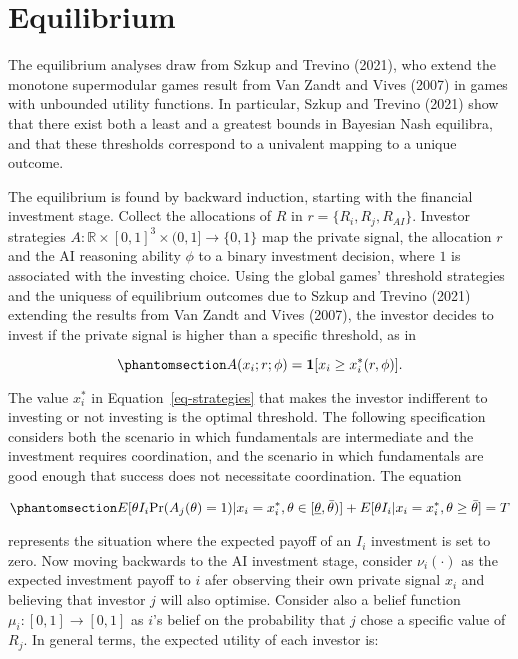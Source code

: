 \documentclass[
]{article}
\theoremstyle{plain}
\theoremstyle{definition}
\theoremstyle{remark}
\begin{document}
\section{Equilibrium}\label{equilibrium}

The equilibrium analyses draw from Szkup and Trevino (2021), who extend
the monotone supermodular games result from Van Zandt and Vives (2007)
in games with unbounded utility functions. In particular, Szkup and
Trevino (2021) show that there exist both a least and a greatest bounds
in Bayesian Nash equilibra, and that these thresholds correspond to a
univalent mapping to a unique outcome.

The equilibrium is found by backward induction, starting with the
financial investment stage. Collect the allocations of \(R\) in
\(r=\{R_i, R_j, R_{AI}\}\). Investor strategies
\(A : \mathbb{R} \times [0,1]^3 \times (0,1]\to \{0,1\}\) map the
private signal, the allocation \(r\) and the AI reasoning ability
\(\phi\) to a binary investment decision, where \(1\) is associated with
the investing choice. Using the global games' threshold strategies and
the uniquess of equilibrium outcomes due to Szkup and Trevino (2021)
extending the results from Van Zandt and Vives (2007), the investor
decides to invest if the private signal is higher than a specific
threshold, as in

\begin{equation}\phantomsection\label{eq-strategies}{
A(x_i;r;\phi) = \mathbf{1}[x_i \geq x_i^*(r, \phi)].
}\end{equation}

The value \(x_i^*\) in Equation~\ref{eq-strategies} that makes the
investor indifferent to investing or not investing is the optimal
threshold. The following specification considers both the scenario in
which fundamentals are intermediate and the investment requires
coordination, and the scenario in which fundamentals are good enough
that success does not necessitate coordination. The equation

\begin{equation}\phantomsection\label{eq-optimthresh}{
E[\theta I_i \text{Pr}(A_j(\theta) = 1)|x_i = x_i^*, \theta \in [\underline{\theta}, \bar{\theta})] + E[\theta I_i|x_i = x_i^*, \theta \geq \bar{\theta}] = T
}\end{equation}

represents the situation where the expected payoff of an \(I_i\)
investment is set to zero. Now moving backwards to the AI investment
stage, consider \(\nu_i(\cdot)\) as the expected investment payoff to
\(i\) afer observing their own private signal \(x_i\) and believing that
investor \(j\) will also optimise. Consider also a belief function
\(\mu_i : [0, 1] \to [0, 1]\) as \(i\)'s belief on the probability that
\(j\) chose a specific value of \(R_j\). In general terms, the expected
utility of each investor is:
\end{document}
